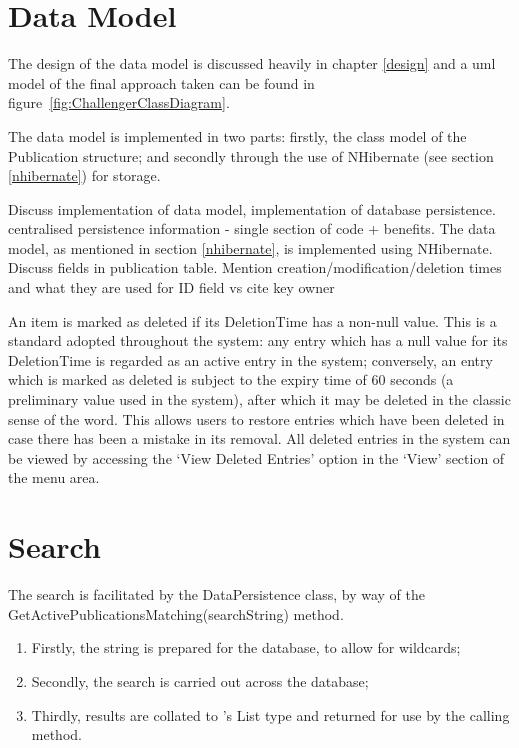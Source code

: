 \section{Data Model}
\label{dataModel}
The design of the data model is discussed heavily in chapter \ref{design} and a \gls{uml} model of the final approach taken can be found in figure~\ref{fig:ChallengerClassDiagram}.

The data model is implemented in two parts: firstly, the class model of the Publication structure; and secondly through the use of NHibernate (see section \ref{nhibernate}) for storage.


Discuss implementation of data model, implementation of database persistence. centralised persistence information - single section of code + benefits.
The data model, as mentioned in section \ref{nhibernate}, is implemented using NHibernate.  
Discuss fields in publication table. Mention creation/modification/deletion times and what they are used for
ID field vs cite key
owner


An item is marked as deleted if its DeletionTime has a non-null value.  This is a standard adopted throughout the system: any entry which has a null value for its DeletionTime is regarded as an active entry in the system; conversely, an entry which is marked as deleted is subject to the expiry time of 60 seconds (a preliminary value used in the system), after which it may be deleted in the classic sense of the word.  This allows users to restore entries which have been deleted in case there has been a mistake in its removal.  All deleted entries  in the system can be viewed by accessing the `View Deleted Entries' option in the `View' section of the menu area.

\section{Search}
\label{searchCore}
The search is facilitated by the DataPersistence class, by way of the GetActivePublicationsMatching(searchString) method.  

\begin{enumerate}
	\item Firstly, the string is prepared for the database, to allow for wildcards;
	\item Secondly, the search is carried out across the database;
	\item Thirdly, results are collated to \cs's List type and returned for use by the calling method.
\end{enumerate}

